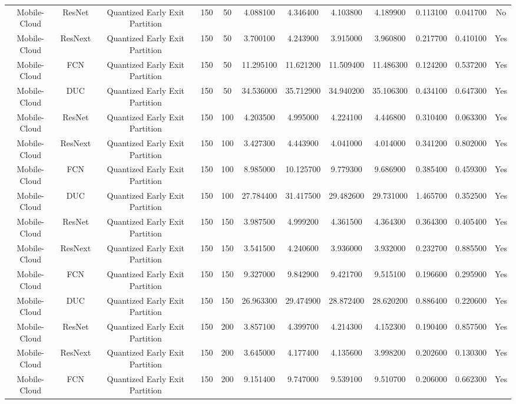 \begin{tabular}{|c||c||c||c||c||c||c||c||c||c||c||c|}
Mobile-Cloud & ResNet & Quantized Early Exit Partition & 150 & 50 & 4.088100 & 4.346400 & 4.103800 & 4.189900 & 0.113100 & 0.041700 & No \\
Mobile-Cloud & ResNext & Quantized Early Exit Partition & 150 & 50 & 3.700100 & 4.243900 & 3.915000 & 3.960800 & 0.217700 & 0.410100 & Yes \\
Mobile-Cloud & FCN & Quantized Early Exit Partition & 150 & 50 & 11.295100 & 11.621200 & 11.509400 & 11.486300 & 0.124200 & 0.537200 & Yes \\
Mobile-Cloud & DUC & Quantized Early Exit Partition & 150 & 50 & 34.536000 & 35.712900 & 34.940200 & 35.106300 & 0.434100 & 0.647300 & Yes \\
Mobile-Cloud & ResNet & Quantized Early Exit Partition & 150 & 100 & 4.203500 & 4.995000 & 4.224100 & 4.446800 & 0.310400 & 0.063300 & Yes \\
Mobile-Cloud & ResNext & Quantized Early Exit Partition & 150 & 100 & 3.427300 & 4.443900 & 4.041000 & 4.014000 & 0.341200 & 0.802000 & Yes \\
Mobile-Cloud & FCN & Quantized Early Exit Partition & 150 & 100 & 8.985000 & 10.125700 & 9.779300 & 9.686900 & 0.385400 & 0.459300 & Yes \\
Mobile-Cloud & DUC & Quantized Early Exit Partition & 150 & 100 & 27.784400 & 31.417500 & 29.482600 & 29.731000 & 1.465700 & 0.352500 & Yes \\
Mobile-Cloud & ResNet & Quantized Early Exit Partition & 150 & 150 & 3.987500 & 4.999200 & 4.361500 & 4.364300 & 0.364300 & 0.405400 & Yes \\
Mobile-Cloud & ResNext & Quantized Early Exit Partition & 150 & 150 & 3.541500 & 4.240600 & 3.936000 & 3.932000 & 0.232700 & 0.885500 & Yes \\
Mobile-Cloud & FCN & Quantized Early Exit Partition & 150 & 150 & 9.327000 & 9.842900 & 9.421700 & 9.515100 & 0.196600 & 0.295900 & Yes \\
Mobile-Cloud & DUC & Quantized Early Exit Partition & 150 & 150 & 26.963300 & 29.474900 & 28.872400 & 28.620200 & 0.886400 & 0.220600 & Yes \\
Mobile-Cloud & ResNet & Quantized Early Exit Partition & 150 & 200 & 3.857100 & 4.399700 & 4.214300 & 4.152300 & 0.190400 & 0.857500 & Yes \\
Mobile-Cloud & ResNext & Quantized Early Exit Partition & 150 & 200 & 3.645000 & 4.177400 & 4.135600 & 3.998200 & 0.202600 & 0.130300 & Yes \\
Mobile-Cloud & FCN & Quantized Early Exit Partition & 150 & 200 & 9.151400 & 9.747000 & 9.539100 & 9.510700 & 0.206000 & 0.662300 & Yes \\

\end{tabular}
